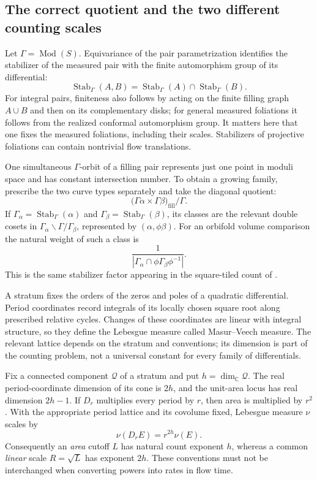 \subsection{The correct quotient and the two different counting scales}
\label{subsec:pairquotient}

Let $\Gamma=\operatorname{Mod}(S)$.  Equivariance of the pair
parametrization identifies the stabilizer of the measured pair with
the finite automorphism group of its differential:
\[
 \operatorname{Stab}_\Gamma(A,B)
 =\operatorname{Stab}_\Gamma(A)\cap\operatorname{Stab}_\Gamma(B).
\]
For integral pairs, finiteness also follows by acting on the finite
filling graph $A\cup B$ and then on its complementary disks; for
general measured foliations it follows from the realized conformal
automorphism group. It matters here that
one fixes the measured foliations, including their scales.  Stabilizers
of projective foliations can contain nontrivial flow translations.

One simultaneous $\Gamma$-orbit of a filling pair represents just one
point in moduli space and has constant intersection number.  To obtain
a growing family, prescribe the two curve types separately and take
the diagonal quotient:
\[
 \bigl(\Gamma\alpha\times\Gamma\beta\bigr)_{\mathrm{fill}}/\Gamma.
\]
If $\Gamma_\alpha=\operatorname{Stab}_\Gamma(\alpha)$ and
$\Gamma_\beta=\operatorname{Stab}_\Gamma(\beta)$, its classes are the
relevant double cosets in
$\Gamma_\alpha\backslash\Gamma/\Gamma_\beta$, represented by
$(\alpha,\phi\beta)$.  For an orbifold volume comparison the natural
weight of such a class is
\[
 \frac{1}{|\Gamma_\alpha\cap
                \phi\Gamma_\beta\phi^{-1}|}.
\]
This is the same stabilizer factor appearing in the square-tiled
count of \cite[Section~1 and Section~3]{AranaHerreraSquare2020}.

A stratum fixes the orders of the zeros and poles of a quadratic
differential. Period coordinates record integrals of its locally
chosen square root along prescribed relative cycles. Changes of
these coordinates are linear with integral structure, so they
define the Lebesgue measure called Masur--Veech measure.
The relevant lattice depends on the stratum and conventions;
its dimension is part of the counting problem, not a universal
constant for every family of differentials.

Fix a connected component $\mathcal Q$ of a stratum and put
$h=\dim_{\mathbb C}\mathcal Q$.  The real period-coordinate dimension
of its cone is $2h$, and the unit-area locus has real dimension $2h-1$.
If $D_r$ multiplies every period by $r$, then area is multiplied by
$r^2$.  With the appropriate period lattice and its covolume fixed,
Lebesgue measure $\nu$ scales by
\[
 \nu(D_r E)=r^{2h}\nu(E).
\]
Consequently an \emph{area} cutoff $L$ has natural count exponent $h$,
whereas a common \emph{linear} scale $R=\sqrt L$ has exponent $2h$.
These conventions must not be interchanged when converting powers
into rates in flow time.

